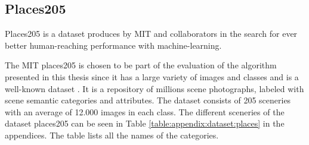 \subsection{Places205}
\label{sec:theory:dataset:places}
Places205 is a dataset produces by MIT and collaborators in the search for ever better human-reaching performance with machine-learning. 

The MIT places205 is chosen to be part of the evaluation of the algorithm presented in this thesis since it has a large variety of images and classes and is a well-known dataset \cite{zhou2016places}. It is a repository of millions scene photographs, labeled with scene semantic categories and attributes. The dataset consists of 205 sceneries with an average of 12.000 images in each class. 
The different sceneries of the dataset places205 can be seen in Table \ref{table:appendix:dataset:places} in the appendices. The table lists all the names of the categories. 




